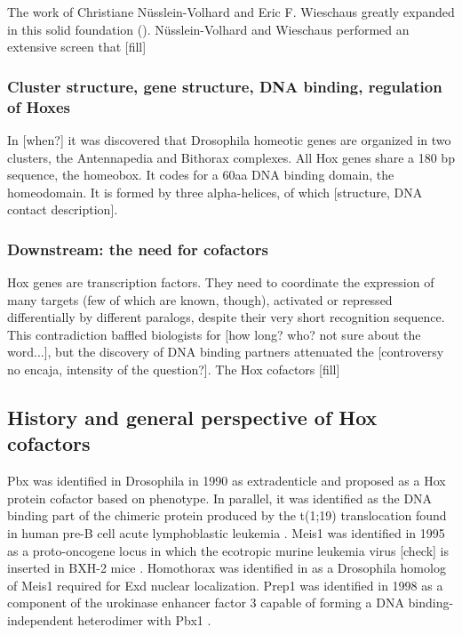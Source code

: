 The work of Christiane Nüsslein-Volhard and Eric F. Wieschaus greatly expanded in this solid foundation (\cite{Nuesslein-Volhard1980}). Nüsslein-Volhard and Wieschaus performed an extensive screen that [fill]

\subsubsection{Cluster structure, gene structure, DNA binding, regulation of Hoxes}


In [when?] it was discovered that Drosophila homeotic genes are organized in two clusters, the Antennapedia \cite{Kaufman1990} and Bithorax \cite{Lewis1978}complexes.
All Hox genes share a 180 bp sequence, the homeobox. It codes for a 60aa DNA binding domain, the homeodomain. It is formed by three alpha-helices, of which [structure, DNA contact description].

\subsubsection{Downstream: the need for cofactors}
Hox genes are transcription factors. They need to coordinate the expression of many targets (few of which are known, though), activated or repressed differentially by different paralogs, despite their very short recognition sequence. This contradiction baffled biologists for [how long? who? not sure about the word...], but the discovery of DNA binding partners attenuated the [controversy no encaja, intensity of the question?]. The Hox cofactors [fill]

\subsection{History and general perspective of Hox cofactors}

Pbx was identified in Drosophila in 1990 as extradenticle \cite{Peifer1990} and proposed as a Hox protein cofactor based on phenotype. In parallel, it was identified as the DNA binding part of the chimeric protein produced by the t(1;19) translocation found in human pre-B cell acute lymphoblastic leukemia \cite{Kamps1990}. 
Meis1 was identified in 1995 as a proto-oncogene locus in which the ecotropic murine leukemia virus [check] is inserted in BXH-2 mice \cite{Moskow1995}. Homothorax was identified in \cite{Rauskolb1995, Rieckhof1997} as a Drosophila homolog of Meis1 required for Exd nuclear localization. 
Prep1 was identified in 1998 as a component of the urokinase enhancer factor 3 capable of forming a DNA binding-independent heterodimer with Pbx1 \cite{Berthelsen1998}.

